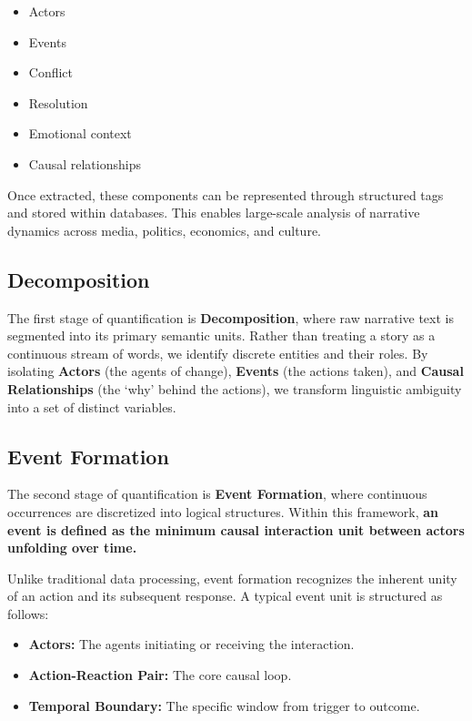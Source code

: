 \documentclass[11pt,a4paper]{article}
\begin{document}
\begin{itemize}[noitemsep]
  \item Actors
  \item Events
  \item Conflict
  \item Resolution
  \item Emotional context
  \item Causal relationships
\end{itemize}

Once extracted, these components can be represented through structured
tags and stored within databases. This enables large-scale analysis of
narrative dynamics across media, politics, economics, and culture.

\subsection{Decomposition}

The first stage of quantification is \textbf{Decomposition}, where raw
narrative text is segmented into its primary semantic units. Rather than
treating a story as a continuous stream of words, we identify discrete
entities and their roles. By isolating \textbf{Actors} (the agents of
change), \textbf{Events} (the actions taken), and \textbf{Causal
Relationships} (the `why' behind the actions), we transform linguistic
ambiguity into a set of distinct variables.

\subsection{Event Formation}

The second stage of quantification is \textbf{Event Formation}, where
continuous occurrences are discretized into logical structures. Within
this framework, \textbf{an event is defined as the minimum causal
interaction unit between actors unfolding over time.}

Unlike traditional data processing, event formation recognizes the
inherent unity of an action and its subsequent response. A typical
event unit is structured as follows:

\begin{itemize}[noitemsep]
  \item \textbf{Actors:} The agents initiating or receiving the interaction.
  \item \textbf{Action-Reaction Pair:} The core causal loop.
  \item \textbf{Temporal Boundary:} The specific window from trigger to outcome.
\end{itemize}
\end{document}
